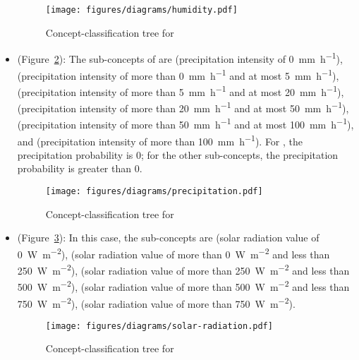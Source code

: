 \begin{itemize}
  \begin{figure}
    \centering
    \texttt{[image: figures/diagrams/humidity.pdf]}
    \caption{Concept-classification tree for }
    \label{fig:tree_humidity}
  \end{figure}

  \item {} (Figure~\ref{fig:tree_precipitation}): The sub-concepts of  are  (precipitation intensity of \SI{0}{\milli\metre\per\hour}),  (precipitation intensity of more than \SI{0}{\milli\metre\per\hour} and at most \SI{5}{\milli\metre\per\hour}),  (precipitation intensity of more than \SI{5}{\milli\metre\per\hour} and at most \SI{20}{\milli\metre\per\hour}),  (precipitation intensity of more than \SI{20}{\milli\metre\per\hour} and at most \SI{50}{\milli\metre\per\hour}),  (precipitation intensity of more than \SI{50}{\milli\metre\per\hour} and at most \SI{100}{\milli\metre\per\hour}), and  (precipitation intensity of more than \SI{100}{\milli\metre\per\hour}). For , the precipitation probability is \num{0}; for the other sub-concepts, the precipitation probability is greater than \num{0}.
  
  \begin{figure}
    \centering
    \texttt{[image: figures/diagrams/precipitation.pdf]}
    \caption{Concept-classification tree for }
    \label{fig:tree_precipitation}
  \end{figure}
  
  \item {} (Figure~\ref{fig:tree_solar_radiation}): In this case, the sub-concepts are  (solar radiation value of \SI{0}{\watt\per\square\meter}),  (solar radiation value of more than \SI{0}{\watt\per\square\meter} and less than \SI{250}{\watt\per\square\meter}),  (solar radiation value of more than \SI{250}{\watt\per\square\meter} and less than \SI{500}{\watt\per\square\meter}),  (solar radiation value of more than \SI{500}{\watt\per\square\meter} and less than \SI{750}{\watt\per\square\meter}),  (solar radiation value of more than \SI{750}{\watt\per\square\meter}).
  
  \begin{figure}
    \centering
    \texttt{[image: figures/diagrams/solar-radiation.pdf]}
    \caption{Concept-classification tree for }
    \label{fig:tree_solar_radiation}
  \end{figure}


\end{itemize}
